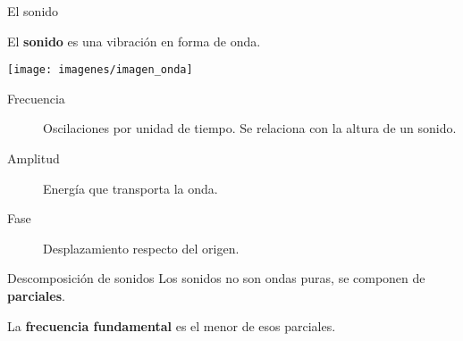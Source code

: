 \begin{frame}{El sonido}
  \begin{center}
    El \textbf{sonido} es una vibración en forma de onda.

    \bigskip
    \bigskip

    \texttt{[image: imagenes/imagen\_onda]}

    \bigskip

    \begin{description}
    \item[Frecuencia] Oscilaciones por unidad de tiempo. Se relaciona con la
      altura de un sonido.
    \item[Amplitud] Energía que transporta la onda.
    \item[Fase] Desplazamiento respecto del origen.
    \end{description}
  \end{center}
\end{frame}

\begin{frame}{Descomposición de sonidos}
  Los sonidos no son ondas puras, se componen de \textbf{parciales}.

  \pause
  \bigskip
  
  La \textbf{frecuencia fundamental} es el menor de esos parciales.

  \pause
  \bigskip


\end{frame}


